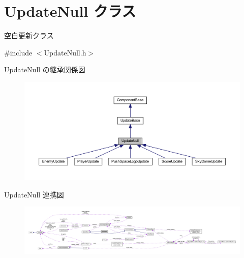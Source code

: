 \hypertarget{class_update_null}{}\section{Update\+Null クラス}
\label{class_update_null}


空白更新クラス  




{\ttfamily \#include $<$Update\+Null.\+h$>$}



Update\+Null の継承関係図\nopagebreak
\begin{figure}[H]
\begin{center}
\leavevmode
\includegraphics[width=350pt]{class_update_null__inherit__graph}
\end{center}
\end{figure}


Update\+Null 連携図\nopagebreak
\begin{figure}[H]
\begin{center}
\leavevmode
\includegraphics[width=350pt]{class_update_null__coll__graph}
\end{center}
\end{figure}
